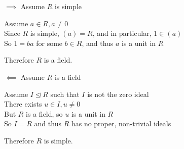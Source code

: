 \documentclass[letterpaper,12pt,fleqn]{article}
\newcommand{\ide}{\trianglelefteq}
\begin{document}
\begin{theproof}
  \listbreak
  \begin{description}
  \item $\implies$ Assume $R$ is simple

    Assume $a\in R,a\ne 0$ \\
    Since $R$ is simple, $(a)=R$, and in particular, $1\in(a)$ \\
    So $1=ba$ for some $b\in R$, and thus $a$ is a unit in $R$

    Therefore $R$ is a field.
\newpage    
  \item $\impliedby$ Assume $R$ is a field
    
    Assume $I\ide R$ such that $I$ is not the zero ideal \\
    There exists $u\in I,u\ne 0$ \\
    But $R$ is a field, so $u$ is a unit in $R$ \\
    So $I=R$ and thus $R$ has no proper, non-trivial ideals

    Therefore $R$ is simple.
  \end{description}
\end{theproof}
\end{document}
